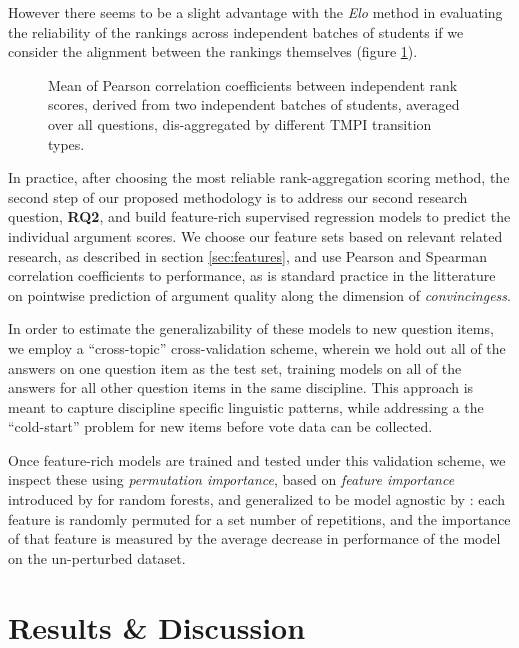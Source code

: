 \documentclass[notitlepage,12pt]{jedm}
\begin{document}
However there seems to be a slight advantage with the \textit{Elo} method in 
evaluating the reliability of the rankings across independent batches of 
students if we consider the alignment between the rankings themselves (figure 
\ref{fig:corr_by_batch}).


\begin{figure}[H]
	\centering
	\scalebox{0.6}{}
	\caption{
		Mean of Pearson correlation coefficients between independent rank 
		scores, derived from two independent batches of students, averaged over 
		all questions, dis-aggregated by different TMPI transition types.
	}
	\label{fig:corr_by_batch}
\end{figure}

In practice, after choosing the most reliable rank-aggregation scoring method, 
the second step of our proposed methodology is to address our second research 
question, \textbf{RQ2}, and build feature-rich supervised regression models to 
predict the individual argument scores.
We choose our feature sets based on relevant related research, as described in 
section \ref{sec:features}, and use Pearson and Spearman correlation 
coefficients to performance, as is standard practice in the litterature on 
pointwise prediction of argument quality along the dimension of 
\textit{convincingess}. 
 
In order to estimate the generalizability of these models to new question 
items, we employ a ``cross-topic'' cross-validation scheme, wherein we hold out 
all of the answers on one question item as the test set, training models on all 
of the answers for all other question items in the same discipline.
This approach is meant to capture discipline specific linguistic patterns, 
while addressing a the ``cold-start'' problem for new items before vote data 
can be collected.

Once feature-rich models are trained and tested under this validation scheme, 
we inspect these using \textit{permutation importance}, based on 
\textit{feature importance} introduced by \cite{breiman_random_2001} for random 
forests, and generalized to be model agnostic by \cite{fisher_all_2019}: each 
feature is randomly permuted for a set number of repetitions, and the 
importance of that feature is measured by the average decrease in performance 
of the model on the un-perturbed dataset.



\section{Results \& Discussion}\label{sec:model_results}
\end{document}

